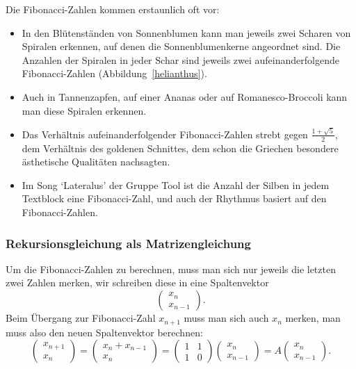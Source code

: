 Die Fibonacci-Zahlen kommen erstaunlich oft vor:
\begin{itemize}
\item In den Blütenständen von Sonnenblumen kann man jeweils zwei
Scharen von Spiralen erkennen, auf denen die Sonnenblumenkerne angeordnet sind.
Die Anzahlen der Spiralen in jeder Schar sind jeweils zwei aufeinanderfolgende
Fibonacci-Zahlen (Abbildung~\ref{helianthus}).
\item Auch in Tannenzapfen, auf einer Ananas oder auf Romanesco-Broccoli
kann man diese Spiralen erkennen.
\item Das Verhältnis aufeinanderfolgender Fibonacci-Zahlen strebt gegen
$\frac{1+\sqrt{5}}2$, dem Verhältnis des goldenen Schnittes, dem schon die
Griechen besondere ästhetische Qualitäten nachsagten.
\item Im Song `Lateralus' der Gruppe Tool ist die Anzahl der Silben
in jedem Textblock eine Fibonacci-Zahl, und auch der Rhythmus basiert
auf den Fibonacci-Zahlen.
\end{itemize}

\subsubsection{Rekursionsgleichung als Matrizengleichung}
Um die Fibonacci-Zahlen zu berechnen, muss man sich nur jeweils die letzten zwei
Zahlen merken, wir schreiben diese in eine Spaltenvektor
\[
\begin{pmatrix}x_n\\x_{n-1}\end{pmatrix}.
\]
Beim Übergang zur Fibonacci-Zahl $x_{n+1}$ muss man sich auch $x_n$ merken,
man muss also den neuen Spaltenvektor berechnen:
\begin{equation}
\begin{pmatrix}x_{n+1}\\x_n\end{pmatrix}
=
\begin{pmatrix}x_n+x_{n-1}\\x_n\end{pmatrix}
=
\begin{pmatrix}
1&1\\
1&0
\end{pmatrix}
\begin{pmatrix}x_n\\x_{n-1}\end{pmatrix}
=
A
\begin{pmatrix}x_n\\x_{n-1}\end{pmatrix}.
\label{fibonaccirekursion}
\end{equation}
